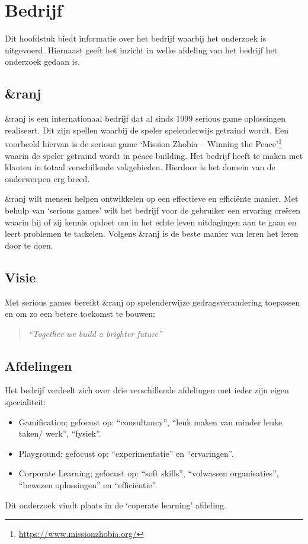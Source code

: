 \chapter{Bedrijf}
\label{ch:bedrijf}
Dit hoofdstuk biedt informatie over het bedrijf waarbij het onderzoek is uitgevoerd. Hiernaast geeft het inzicht in welke afdeling van het bedrijf het onderzoek gedaan is. 

\section{\&ranj}
\&ranj is een internationaal bedrijf dat al sinds 1999 serious game oplossingen realiseert. Dit zijn spellen waarbij de speler spelenderwijs getraind wordt. Een voorbeeld hiervan is de serious game ‘Mission Zhobia – Winning the Peace’\footnote{\url{https://www.missionzhobia.org/}} waarin de speler getraind wordt in peace building. Het bedrijf heeft te maken met klanten in totaal verschillende vakgebieden. Hierdoor is het domein van de onderwerpen erg breed.

\&ranj wilt mensen helpen ontwikkelen op een effectieve en efficiënte manier. Met behulp van ‘serious games’ wilt het bedrijf voor de gebruiker een ervaring creëren waarin hij of zij kennis opdoet om in het echte leven uitdagingen aan te gaan en leert problemen te tackelen. Volgens \&ranj is de beste manier van leren het leren door te doen.

\section{Visie}
Met serious games bereikt \&ranj op spelenderwijze gedragsverandering toepassen en om zo een betere toekomst te bouwen:

\begin{quote} 
    \centering
    \large
    \textit{
        “Together we build a brighter future”
    }
\end{quote}

\section{Afdelingen}
Het bedrijf verdeelt zich over drie verschillende afdelingen met ieder zijn eigen specialiteit:
\begin{itemize}
    \item Gamification; gefocust op: “consultancy”, “leuk maken van minder leuke taken/ werk”, “fysiek”.
    \item Playground; gefocust op: “experimentatie” en “ervaringen”.
    \item Corporate Learning; gefocust op: “soft skills”, “volwassen organisaties”, “bewezen oplossingen” en “efficiëntie”.
\end{itemize}
Dit onderzoek vindt plaats in de ‘coperate learning’ afdeling.

